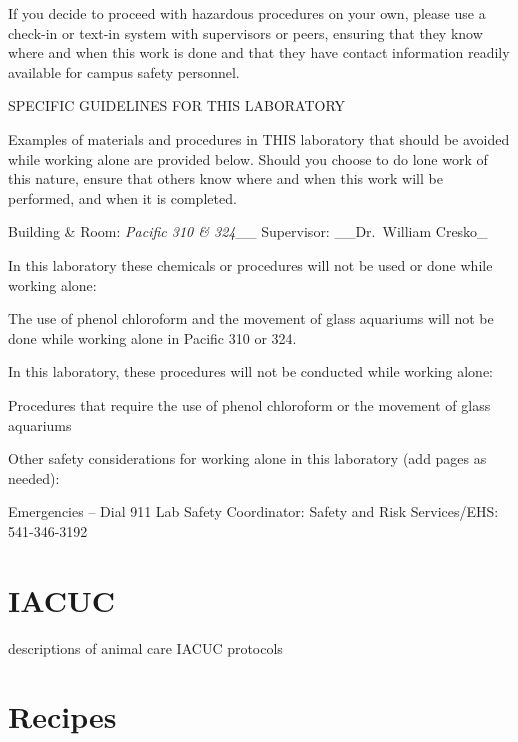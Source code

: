 \documentclass[
]{book}
\begin{document}
If you decide to proceed with hazardous procedures on your own, please use a check-in or text-in system with supervisors or peers, ensuring that they know where and when this work is done and that they have contact information readily available for campus safety personnel.

SPECIFIC GUIDELINES FOR THIS LABORATORY

Examples of materials and procedures in THIS laboratory that should be avoided while working alone are provided below. Should you choose to do lone work of this nature, ensure that others know where and when this work will be performed, and when it is completed.

Building \& Room: \emph{Pacific 310 \& 324}\_\_ Supervisor: \_\_Dr.~William Cresko\_

In this laboratory these chemicals or procedures will not be used or done while working alone:

The use of phenol chloroform and the movement of glass aquariums will not be done while working alone in Pacific 310 or 324.

In this laboratory, these procedures will not be conducted while working alone:

Procedures that require the use of phenol chloroform or the movement of glass aquariums

Other safety considerations for working alone in this laboratory (add pages as needed):

Emergencies -- Dial 911
Lab Safety Coordinator:
Safety and Risk Services/EHS: 541-346-3192

\hypertarget{iacuc}{%
\chapter{IACUC}\label{iacuc}}

descriptions of animal care IACUC protocols

\hypertarget{recipes}{%
\chapter{Recipes}\label{recipes}}
\end{document}
